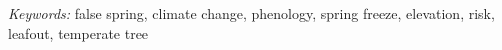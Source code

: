 \documentclass{article}\usepackage[]{graphicx}\usepackage[]{color}
\begin{document}


\vspace{2ex}
\textit{Keywords:} false spring, climate change, phenology, spring freeze, elevation, risk, leafout, temperate tree %

\end{document}
